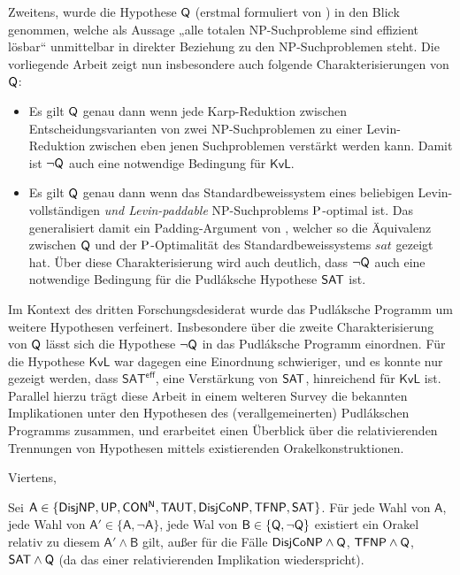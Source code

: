 Zweitens, wurde die Hypothese $\hQ$ (erstmal formuliert von \cite{fenner_inverting_1996}) in den Blick genommen, welche als Aussage „alle totalen NP-Suchprobleme sind effizient lösbar“ unmittelbar in direkter Beziehung zu den NP-Suchproblemen steht.
Die vorliegende Arbeit zeigt nun insbesondere auch folgende Charakterisierungen von $\hQ$:
\begin{itemize}
    \item Es gilt $\hQ$ genau dann wenn jede Karp-Reduktion zwischen Entscheidungsvarianten von zwei NP-Suchproblemen zu einer Levin-Reduktion zwischen eben jenen Suchproblemen verstärkt werden kann. Damit ist $\neg\hQ$ auch eine notwendige Bedingung für $\mathsf{KvL}$.
    \item Es gilt $\hQ$ genau dann wenn das Standardbeweissystem eines beliebigen Levin-vollständigen \emph{und Levin-paddable} NP-Suchproblems $\P$-optimal ist. Das generalisiert damit ein Padding-Argument von \textcite{messner_simulation_2001}, welcher so die Äquivalenz zwischen $\hQ$ und der $\P$-Optimalität des Standardbeweissystems $\mathit{sat}$ gezeigt hat. Über diese Charakterisierung wird auch deutlich, dass $\neg\hQ$ auch eine notwendige Bedingung für die Pudláksche Hypothese $\hSAT$ ist.
\end{itemize}
Im Kontext des dritten Forschungsdesiderat wurde das Pudláksche Programm um weitere Hypothesen verfeinert. Insbesondere über die zweite Charakterisierung von $\hQ$ lässt sich die Hypothese $\neg\hQ$ in das Pudláksche Programm einordnen. Für die Hypothese $\mathsf{KvL}$ war dagegen eine Einordnung schwieriger, und es konnte nur gezeigt werden, dass $\mathsf{SAT^{eff}}$, eine Verstärkung von $\hSAT$, hinreichend für $\mathsf{KvL}$ ist.
Parallel hierzu trägt diese Arbeit in einem welteren Survey die bekannten Implikationen unter den Hypothesen des (verallgemeinerten) Pudlákschen Programms zusammen, und erarbeitet einen Überblick über die relativierenden Trennungen von Hypothesen mittels existierenden Orakelkonstruktionen. 

Viertens, 




\begin{corollary}
    Sei $\mathsf A \in \{\hDisjNP, \hUP, \mathsf{CON^{N}}, \hTAUT, \hDisjCoNP, \hTFNP, \hSAT\}$.
    Für jede Wahl von $\mathsf A$, jede Wahl von $\mathsf A' \in\{\mathsf A, \neg\mathsf A\}$, jede Wal von $\mathsf B\in \{\hQ, \neg\hQ\}$ existiert ein Orakel relativ zu diesem $\mathsf A'\land \mathsf B$ gilt, außer für die Fälle $\hDisjCoNP\land\hQ$, $\hTFNP\land\hQ$, $\hSAT\land\hQ$ (da das einer relativierenden Implikation wiederspricht).
\end{corollary}
